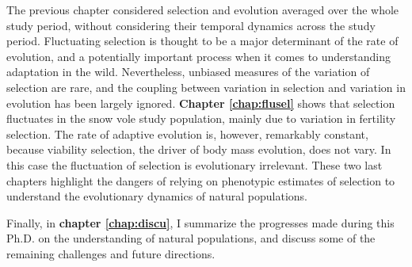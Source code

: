 The previous chapter considered selection and evolution averaged over the whole study period, without considering their temporal dynamics across the study period. Fluctuating selection is thought to be a major determinant of the rate of evolution, and a potentially important process when it comes to understanding adaptation in the wild. 
Nevertheless, unbiased measures of the variation of selection are rare, and the coupling between variation in selection and variation in evolution has been largely ignored. \textbf{Chapter \ref{chap:flusel}} shows that selection fluctuates in the snow vole study population, mainly due to variation in fertility selection. The rate of adaptive evolution is, however, remarkably constant, because viability selection, the driver of body mass evolution, does not vary. In this case the fluctuation of selection is evolutionary irrelevant. These two last chapters highlight the dangers of relying on phenotypic estimates of selection to understand the evolutionary dynamics of natural populations.

Finally, in \textbf{chapter \ref{chap:discu}}, I summarize the progresses made during this Ph.D. on the understanding of natural populations, and discuss some of the remaining challenges and future directions.

\printbibliography[heading=subbibliography]